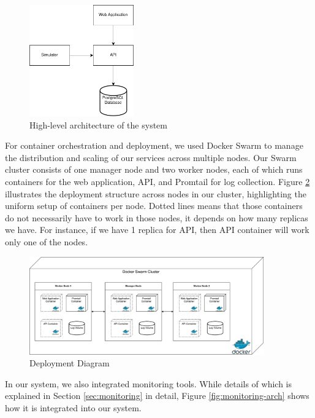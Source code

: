 \begin{figure}[H]
  \centering
  \includegraphics[width=0.4\textwidth]{images/simple-arch.png}
  \caption{High-level architecture of the system}
  \label{fig:simple-architecture}
\end{figure}

For container orchestration and deployment, we used Docker Swarm to manage the distribution and scaling of our services across multiple nodes. Our Swarm cluster consists of one manager node and two worker nodes, each of which runs containers for the web application, API, and Promtail for log collection. Figure \ref{fig:docker-swarm} illustrates the deployment structure across nodes in our cluster, highlighting the uniform setup of containers per node. Dotted lines means that those containers do not necessarily have to work in those nodes, it depends on how many replicas we have. For instance, if we have 1 replica for API, then API container will work only one of the nodes. 

\begin{figure}[H]
  \centering
  \includegraphics[width=0.9\textwidth]{images/docker-swarm.png}
  \caption{Deployment Diagram}
  \label{fig:docker-swarm}
\end{figure}

In our system, we also integrated monitoring tools. While details of which is explained in Section \ref{sec:monitoring} in detail, Figure \ref{fig:monitoring-arch} shows how it is integrated into our system. 

